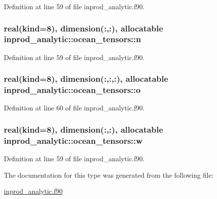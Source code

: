 Definition at line 59 of file inprod\-\_\-analytic.\-f90.

\hypertarget{structinprod__analytic_1_1ocean__tensors_a5087e225a596aee2d668f6282dd6a019}{
\subsubsection[{n}]{\setlength{\rightskip}{0pt plus 5cm}real(kind=8), dimension(\-:,\-:), allocatable inprod\-\_\-analytic\-::ocean\-\_\-tensors\-::n\hspace{0.3cm}{\ttfamily [private]}}}\label{structinprod__analytic_1_1ocean__tensors_a5087e225a596aee2d668f6282dd6a019}


Definition at line 59 of file inprod\-\_\-analytic.\-f90.

\hypertarget{structinprod__analytic_1_1ocean__tensors_abab4899297820e7a92cc8d363a91ed13}{
\subsubsection[{o}]{\setlength{\rightskip}{0pt plus 5cm}real(kind=8), dimension(\-:,\-:,\-:), allocatable inprod\-\_\-analytic\-::ocean\-\_\-tensors\-::o\hspace{0.3cm}{\ttfamily [private]}}}\label{structinprod__analytic_1_1ocean__tensors_abab4899297820e7a92cc8d363a91ed13}


Definition at line 60 of file inprod\-\_\-analytic.\-f90.

\hypertarget{structinprod__analytic_1_1ocean__tensors_ae4875d9d3ea854b3b7b57e0c07a07ede}{
\subsubsection[{w}]{\setlength{\rightskip}{0pt plus 5cm}real(kind=8), dimension(\-:,\-:), allocatable inprod\-\_\-analytic\-::ocean\-\_\-tensors\-::w\hspace{0.3cm}{\ttfamily [private]}}}\label{structinprod__analytic_1_1ocean__tensors_ae4875d9d3ea854b3b7b57e0c07a07ede}


Definition at line 59 of file inprod\-\_\-analytic.\-f90.



The documentation for this type was generated from the following file\-:\begin{DoxyCompactItemize}
\item 
\hyperlink{inprod__analytic_8f90}{inprod\-\_\-analytic.\-f90}\end{DoxyCompactItemize}
